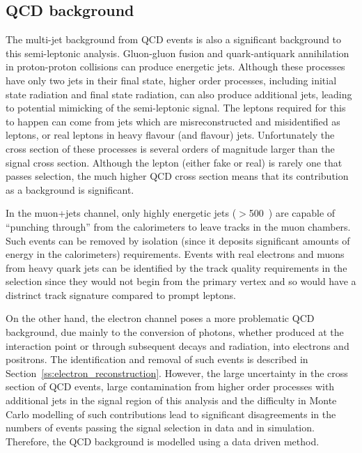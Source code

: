 \subsection{QCD background}
\label{ss:qcd}
The multi-jet background from QCD events is also a significant background to this semi-leptonic \ttbar
analysis. Gluon-gluon fusion and quark-antiquark annihilation in proton-proton collisions can produce
energetic jets. Although these processes have only two jets in their final state, higher order processes,
including initial state radiation and final state radiation, can also produce additional jets, leading to
potential mimicking of the semi-leptonic \ttbar signal. The leptons required for this to happen can come from
jets which are misreconstructed and misidentified as leptons, or real leptons in heavy flavour (\cPqb and
\cPqc flavour) jets. Unfortunately the cross section of these processes is several orders of magnitude larger
than the signal cross section. Although the lepton (either fake or real) is rarely one that passes selection,
the much higher QCD cross section means that its contribution as a background is significant.

In the muon+jets channel, only highly energetic jets (\pt$>$500~\GeV) are capable of ``punching through''
from the calorimeters to leave tracks in the muon chambers. Such events can be removed by isolation (since it
deposits significant amounts of energy in the calorimeters) requirements. Events with real electrons and muons
from heavy quark jets can be identified by the track quality requirements in the selection since they would
not begin from the primary vertex and so would have a distrinct track signature compared to prompt leptons.

On the other hand, the electron channel poses a more problematic QCD background, due mainly to the conversion
of photons, whether produced at the interaction point or through subsequent decays and radiation, into
electrons and positrons. The identification and removal of such events is described in
Section~\ref{ss:electron_reconstruction}. However, the large uncertainty in the cross section of QCD events,
large contamination from higher order processes with additional jets in the signal region of this analysis and
the difficulty in Monte Carlo modelling of such contributions lead to significant disagreements in the numbers
of events passing the signal selection in data and in simulation. Therefore, the QCD background is modelled
using a data driven method.

